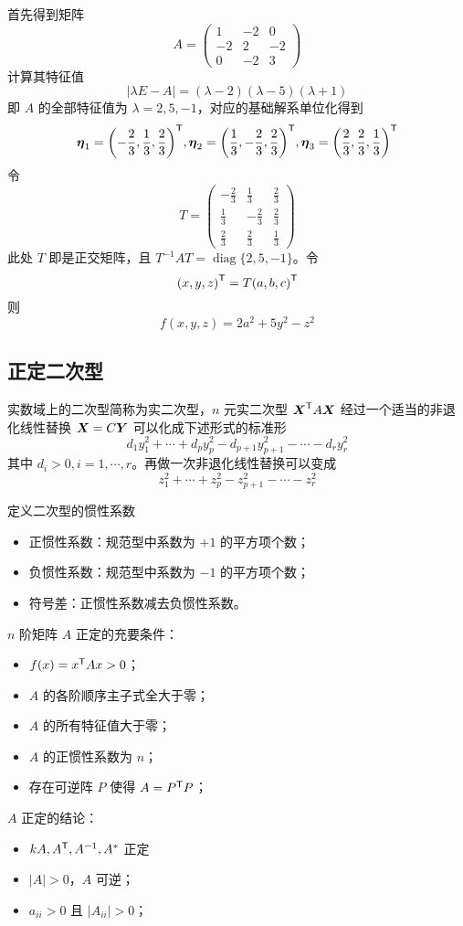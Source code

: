 \begin{solution}
	首先得到矩阵
	\[ A = \left(\begin{matrix}
				1 & -2 & 0 \\ -2 & 2 & -2 \\ 0 & -2 & 3
			\end{matrix}\right) \]
	计算其特征值
	\[ |\lambda E -A| = (\lambda - 2)(\lambda - 5)(\lambda + 1) \]
	即 $A$ 的全部特征值为 $\lambda = 2, 5, -1$，对应的基础解系单位化得到
	\[ \boldsymbol{\eta}_1 = {\left(-\frac{2}{3}, \frac{1}{3}, \frac{2}{3}\right)}^\mathsf{T}, \boldsymbol{\eta}_2 = {\left(\frac{1}{3}, -\frac{2}{3}, \frac{2}{3}\right)}^\mathsf{T}, \boldsymbol{\eta}_3 = {\left(\frac{2}{3}, \frac{2}{3}, \frac{1}{3}\right)}^\mathsf{T}  \]
	令
	\[ T = \left(\begin{matrix}
				-\frac{2}{3} & \frac{1}{3}  & \frac{2}{3} \\
				\frac{1}{3}  & -\frac{2}{3} & \frac{2}{3} \\
				\frac{2}{3}  & \frac{2}{3}  & \frac{1}{3}
			\end{matrix}\right) \]
	此处 $T$ 即是正交矩阵，且 $T^{-1}AT = \operatorname{diag}\{2, 5, -1\}$。令
	\[ {\left(x, y, z\right)}^\mathsf{T} = T {\left(a, b, c\right)}^\mathsf{T} \]
	则
	\[ f(x, y, z) = 2a^2 + 5y^2 - z^2 \]
\end{solution}

\subsection{正定二次型}

实数域上的二次型简称为实二次型，$n$ 元实二次型 ${\boldsymbol{X}}^\mathsf{T}A\boldsymbol{X}$ 经过一个适当的非退化线性替换 $\boldsymbol{X} = C\boldsymbol{Y}$ 可以化成下述形式的标准形
\[ d_1y_1^2+\cdots+d_py_p^2-d_{p+1}y_{p+1}^2-\cdots-d_ry_r^2 \]
其中 $d_i>0,i=1,\cdots,r$。再做一次非退化线性替换可以变成
\[ z_1^2+\cdots+z_p^2-z_{p+1}^2-\cdots-z_r^2 \]

定义二次型的惯性系数
\begin{itemize}
	\item 正惯性系数：规范型中系数为 $+1$ 的平方项个数；
	\item 负惯性系数：规范型中系数为 $-1$ 的平方项个数；
	\item 符号差：正惯性系数减去负惯性系数。
\end{itemize}

$n$ 阶矩阵 $A$ 正定的充要条件：
\begin{itemize}
	\item $f(x) = {x}^\mathsf{T}Ax > 0$；
	\item $A$ 的各阶顺序主子式全大于零；
	\item $A$ 的所有特征值大于零；
	\item $A$ 的正惯性系数为 $n$；
	\item 存在可逆阵 $P$ 使得 $A = {P}^\mathsf{T}P$；
\end{itemize}

$A$ 正定的结论：
\begin{itemize}
	\item $kA, {A}^\mathsf{T}, A^{-1}, A^*$ 正定
	\item $|A|>0$，$A$ 可逆；
	\item $a_{ii} > 0$ 且 $|A_{ii}| > 0$；
\end{itemize}
